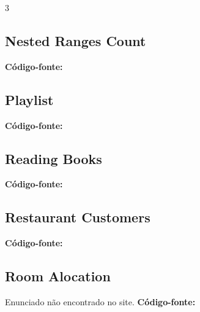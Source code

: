 \documentclass[8pt]{extarticle}
\begin{document}
\begin{multicols*}{3}
\subsection{Nested Ranges Count}
\begin{caixaenunciado}

\end{caixaenunciado}
\vspace{0.3cm}
\noindent\textbf{Código-fonte:}


\subsection{Playlist}
\begin{caixaenunciado}

\end{caixaenunciado}
\vspace{0.3cm}
\noindent\textbf{Código-fonte:}


\subsection{Reading Books}
\begin{caixaenunciado}

\end{caixaenunciado}
\vspace{0.3cm}
\noindent\textbf{Código-fonte:}


\subsection{Restaurant Customers}
\begin{caixaenunciado}

\end{caixaenunciado}
\vspace{0.3cm}
\noindent\textbf{Código-fonte:}


\subsection{Room Alocation}
Enunciado não encontrado no site.
\vspace{0.3cm}
\noindent\textbf{Código-fonte:}



\end{multicols*}
\end{document}
